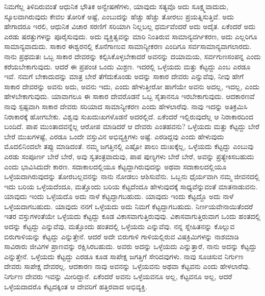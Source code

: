 ನಿಮಗೆಲ್ಲ ತಿಳಿದಿರುವಂತೆ ಆಧುನಿಕ ಭೌತಿಕ ಅನ್ವೇಷಣೆಗಳು, ಯಾವುದು ಸತ್ಯವೊ ಅದು ಸೂಕ್ಷ್ಮವಾದುದು, ಸ್ಕೂಲವಾಗಿರುವುದು ಕೇವಲ ತೋರಿಕೆ ಅಷ್ಟೆ, ಎಂಬುದನ್ನು ಹೆಚ್ಚು ಹೆಚ್ಚು ತೋರಲು ಪ್ರಯತ್ನಿಸುತ್ತಿವೆ. ಅದು ಹೇಗಾದರೂ ಇರಲಿ, ಆಧುನಿಕ ವಿಚಾರ ಸರಣಿಗೆ ಸರಿಯಾಗಿ ನಿಲ್ಲಬಲ್ಲ ಧರ್ಮವೆಂದರೆ ಅದು ಅದೈತ. ಏಕೆಂದರೆ ಅದು ಎರಡು ಷರತ್ತುಗಳನ್ನು ಪೂರೈಸುವುದು. ಅದು ವ್ಯಕ್ತಿತ್ವವನ್ನು ಮಾರಿ ನಿಂತಿರುವ ಸಾಮಾನ್ಯವರ್ಗಿಕರಣ, ಅದು ಎಲ್ಲರಿಗೂ ಸಾಮಾನ್ಯವಾದುದು. ಸಾಕಾರ ಈಶ್ವರನಲ್ಲಿ ಕೊನೆಗಾಣುವ ಸಾಮಾನ್ಯೀಕರಣ ಎಂದಿಗೂ ಸರ್ವಸಾಮಾನ್ಯವಾಗಲಾರದು. ನಾನು ಪ್ರಥಮತಃ ಒಬ್ಬ ಸಾಕಾರ ದೇವರನ್ನು ಕಲ್ಪಿಸಿಕೊಳ್ಳಬೇಕಾದರೆ ಅವನನ್ನು ದಯಾಮಯ, ಸರ್ವಗುಣಸಂಪನ್ನ ಎಂದು ಕರೆಯಬೇಕಾಗುವುದು. ಆದರೆ ಈ ಪ್ರಪಂಚ ಒಂದು ಮಿಶ್ರಣ. ಇದರಲ್ಲಿ ಒಳ್ಳೆಯದು ಮತ್ತು ಕೆಟ್ಟದ್ದು ಎಂಬ ಎರಡೂ ಇವೆ. ನಮಗೆ ಬೇಕಾದುದನ್ನು ಮಾತ್ರ ಬೇರೆ ತೆಗೆದುಕೊಂಡು ಅದನ್ನು ಸಾಕಾರ ದೇವರು ಎನ್ನುವೆವು, ನೀವು ಹೇಗೆ ಸಾಕಾರ ದೇವರನ್ನು ಅವನು ಅದು, ಅವನು ಇದು, ಎಂದು ಹೇಳುತ್ತೀರೋ ಹಾಗೆಯೇ ಅವನು ಅದಲ್ಲ, ಇದಲ್ಲ, ಎಂದು ಹೇಳಬೇಕಾಗುವುದು. ಯಾವಾಗಲೂ ಈ ಸಾಕಾರ ದೇವರೊಡನೆ ಒಬ್ಬ ಸೈತಾನನೂ ಇರಬೇಕಾಗುವುದು. ಆದಕಾರಣವೆ ನಾವು ಸ್ಪಷ್ಟವಾಗಿ ಸಾಕಾರ ದೇವರು ಸರಿಯಾದ ಸಾಮಾನ್ಯೀಕರಣ ಎಂದು ಹೇಳಲಾರೆವು. ನಾವು ಇದನ್ನು ಅತಿಕ್ರಮಿಸಿ ನಿರಾಕಾರಕ್ಕೆ ಹೋಗಬೇಕು. ವಿಶ್ವವು ಸುಖದುಃಖಗಳೊಡನೆ ಅದರಲ್ಲಿದೆ. ಏಕೆಂದರೆ ಇಲ್ಲಿರುವುದೆಲ್ಲ ಆ ನಿರಾಕಾರದಿಂದ ಬಂದಿದೆ. ಪಾಪ ಮುಂತಾದವನ್ನೆಲ್ಲ ಆರೋಪ ಮಾಡಿದರೆ ಆ ದೇವರು ಎಂತಹವನು? ಒಳ್ಳೆಯದು ಮತ್ತು ಕೆಟ್ಟದ್ದು ಬೇರೆ ಬೇರೆ ಮುಖಗಳಷ್ಟೆ, ಎರಡೂ ಒಂದೇ ವಸ್ತುವಿನ ಅಭಿವ್ಯಕ್ತಿಗಳು ಅಷ್ಟೆ. ಎರಡಿದ್ದವು ಎಂದು ಹೇಳುವುದು ಮೊದಲಿನಿಂದಲೇ ತಪ್ಪು ಮಾಡಿದಂತೆ. ನಮ್ಮ ಜಗತ್ತಿನಲ್ಲಿ ಎಷ್ಟೋ ಪಾಲು ದುಃಖಕ್ಕೆಲ್ಲ, ಒಳ್ಳೆಯದು ಕೆಟ್ಟದ್ದು ಎಂಬುವು ಎರಡು ಸಂಪೂರ್ಣ ಬೇರೆ ಬೇರೆ, ಅವು ಸ್ವತಂತ್ರವಾದುವು, ಪಾಪ ಪುಣ್ಯಗಳು ಬೇರೆ ಬೇರೆ, ಅವನ್ನು ಪ್ರತ್ಯೇಕಿಸಬಹುದು ಎಂದು ಭಾವಿಸಿದುದೇ ಕಾರಣ. ಸದಾಕಾಲದಲ್ಲಿಯೂ ಕೆಟ್ಟದ್ದಾಗಿರುವುದನ್ನು ಅಥವಾ ಸದಾಕಾಲದಲ್ಲಿಯೂ ಒಳ್ಳೆಯದಾಗಿರುವುದನ್ನು ತೋರಬಲ್ಲವನನ್ನು ನಾನು ನೋಡಲು ಆಶಿಸುವೆನು. ಒಬ್ಬನು ಧೈರ್ಯವಾಗಿ ನಮ್ಮ ಜೀವನದಲ್ಲಿ ಇದು ಬರಿಯ ಒಳ್ಳೆಯದೆಂದೂ, ಮತ್ತೊಂದು ಬರಿಯ ಕೆಟ್ಟದೆಂದೂ ಹೇಳುವುದಕ್ಕೆ ಸಾಧ್ಯವೆನ್ನುವಂತೆ ಮಾತನಾಡುವನು. ಯಾವುದು ಇಂದು ಒಳ್ಳೆಯದೊ ಅದು ನಾಳೆ ಕೆಟ್ಟದ್ದಾಗಬಹುದು. ಯಾವುದು ಇಂದು ಕೆಟ್ಟದ್ದೊ ಅದು ನಾಳೆ ಒಳ್ಳೆಯದಾಗಬಹುದು. ಯಾವುದು ನನಗೆ ಒಳ್ಳೆಯದು ಅದು ನಿಮಗೆ ಕೆಟ್ಟದ್ದಾಗಬಹುದು. ನಿರ್ಣಯವೇನಾಯಿತೆಂದರೆ ಇತರ ವಸ್ತುಗಳಂತೆಯೇ ಒಳ್ಳೆಯದು ಕೆಟ್ಟದ್ದು ಕೂಡ ವಿಕಾಸವಾಗುತ್ತಿರುವುವು. ವಿಕಾಸವಾಗುತ್ತಿರುವಾಗ ಒಂದು ಹಂತದಲ್ಲಿ ಅದನ್ನು ಕೆಟ್ಟದ್ದು ಎನ್ನುವೆವು, ಮತ್ತೊಂದು ಹಂತದಲ್ಲಿ ಒಳ್ಳೆಯದು ಎನ್ನುವೆವು. ನನ್ನ ಸ್ನೇಹಿತನನ್ನು ಕೊಲ್ಲುವ ಬಿರುಗಾಳಿಯನ್ನು ಕೆಟ್ಟದ್ದು ಎನ್ನುತ್ತೇನೆ. ಆದರೆ ಅದೇ ಬಿರುಗಾಳಿ ಗಾಳಿಯಲ್ಲಿರುವ ವಿಷಕ್ರಿಮಿಗಳನ್ನು ನಾಶಮಾಡಿ ಸಾವಿರಾರು ಜೀವಿಗಳ ಪ್ರಾಣವನ್ನು ರಕ್ಷಿಸಿರಬಹುದು. ಅವರು ಅದನ್ನು ಒಳ್ಳೆಯದು ಎನ್ನುತ್ತಾರೆ, ನಾನು ಅದನ್ನು ಕೆಟ್ಟದ್ದು ಎನ್ನುತ್ತೇನೆ. ಒಳ್ಳೆಯದು ಕೆಟ್ಟದ್ದು ಎರಡೂ ಕೂಡ ಸಾಪೇಕ್ಷ ಜಗತ್ತಿಗೆ ಸೇರಿದವುಗಳು. ನಾವು ಸೂಚಿಸುವ ನಿರ್ಗುಣ ದೇವರು ಸಾಪೇಕ್ಷ ದೇವರಲ್ಲ. ಆದಕಾರಣ ನಾವು ಅವನನ್ನು ಒಳ್ಳೆಯವನು ಅಥವಾ ಕೆಟ್ಟವನು ಎಂದು ಹೇಳಲಾರೆವು. ನಿರ್ಗುಣ ದೇವರು ಇವನ್ನು ಮೀರಿದ್ದಾನೆ. ಏಕೆಂದರೆ ಅವನು ಒಳ್ಳೆಯವನೂ ಅಲ್ಲ, ಕೆಟ್ಟವನೂ ಅಲ್ಲ, ಆದರೆ ಒಳ್ಳೆಯದಾದರೊ ಕೆಟ್ಟದಕ್ಕಿಂತ ಆ ದೇವರಿಗೆ ಹತ್ತಿರವಾದ ಅಭಿವ್ಯಕ್ತಿ.


